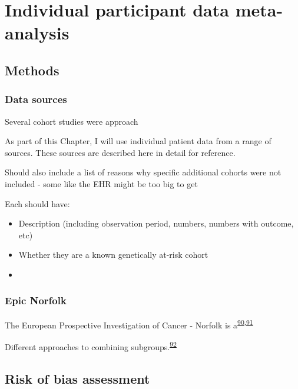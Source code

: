 \documentclass[a4paper, twoside]{templates/ociamthesis}
\providecommand{\tightlist}{%
  \setlength{\itemsep}{0pt}\setlength{\parskip}{0pt}}
\begin{document}
\hypertarget{ipd-heading}{%
\chapter{Individual participant data meta-analysis}\label{ipd-heading}}

\minitoc 

\hypertarget{methods-2}{%
\section{Methods}\label{methods-2}}

\hypertarget{data-sources}{%
\subsection{Data sources}\label{data-sources}}

Several cohort studies were approach

As part of this Chapter, I will use individual patient data from a range of sources. These sources are described here in detail for reference.

Should also include a list of reasons why specific additional cohorts were not included - some like the EHR might be too big to get

Each should have:

\begin{itemize}
\tightlist
\item
  Description (including observation period, numbers, numbers with outcome, etc)
\item
  Whether they are a known genetically at-risk cohort
\item
\end{itemize}

\hypertarget{epic-norfolk}{%
\subsection{Epic Norfolk}\label{epic-norfolk}}

The European Prospective Investigation of Cancer - Norfolk is a\textsuperscript{\protect\hyperlink{ref-riboli1997}{90},\protect\hyperlink{ref-riboli2002}{91}}

Different approaches to combining subgroups.\textsuperscript{\protect\hyperlink{ref-fisher2017}{92}}

\hypertarget{risk-of-bias-assessment}{%
\section{Risk of bias assessment}\label{risk-of-bias-assessment}}
\end{document}
